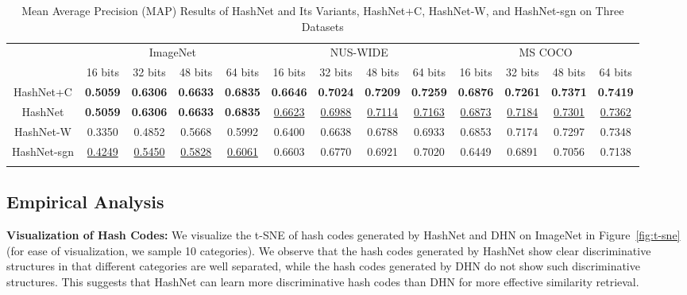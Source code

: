 \documentclass[10pt,twocolumn,letterpaper]{article}
\begin{document}
\begin{table*}[htb]
    \centering
    \addtolength{\tabcolsep}{-1.7pt}
    \caption{Mean Average Precision (MAP) Results of HashNet and Its Variants, HashNet+C, HashNet-W, and HashNet-sgn on Three Datasets}
    \label{table:ablation}
    \begin{tabular}{c|cccc|cccc|cccc}
        \Xhline{1.0pt}
        \multirow{2}{30pt}{\centering Method} & \multicolumn{4}{c|}{ImageNet} & \multicolumn{4}{c|}{NUS-WIDE} & \multicolumn{4}{c}{MS COCO} \\
        \cline{2-13}
        & 16 bits & 32 bits  & 48 bits  & 64 bits & 16 bits & 32 bits  & 48 bits  & 64 bits & 16 bits & 32 bits  & 48 bits  & 64 bits \\
        \hline
        HashNet+C & \textbf{0.5059} & \textbf{0.6306} & \textbf{0.6633} & \textbf{0.6835} & \textbf{0.6646} & \textbf{0.7024} & \textbf{0.7209} & \textbf{0.7259} & \textbf{0.6876} & \textbf{0.7261} & \textbf{0.7371} & \textbf{0.7419} \\
        HashNet & \textbf{0.5059} & \textbf{0.6306} & \textbf{0.6633} & \textbf{0.6835} & \underline{0.6623} & \underline{0.6988} & \underline{0.7114} & \underline{0.7163} & \underline{0.6873} & \underline{0.7184} & \underline{0.7301} & \underline{0.7362} \\
        HashNet-W & 0.3350 & 0.4852 & 0.5668 & 0.5992 & 0.6400 & 0.6638 & 0.6788 & 0.6933 & 0.6853 & 0.7174 & 0.7297 & 0.7348  \\
        HashNet-sgn & \underline{0.4249} & \underline{0.5450} & \underline{0.5828} & \underline{0.6061} & 0.6603 & 0.6770 & 0.6921 & 0.7020 & 0.6449 & 0.6891 & 0.7056 & 0.7138 \\
        \Xhline{1.0pt}
    \end{tabular}
    \normalsize
    \vspace{-10pt}
\end{table*}

\subsection{Empirical Analysis}
\textbf{Visualization of Hash Codes:}
We visualize the t-SNE \cite{cite:ICML14DeCAF} of hash codes generated by HashNet and DHN on ImageNet in Figure~\ref{fig:t-sne} (for ease of visualization, we sample 10 categories). We observe that the hash codes generated by HashNet show clear discriminative structures in that different categories are well separated, while the hash codes generated by DHN do not show such discriminative structures. This suggests that HashNet can learn more discriminative hash codes than DHN for more effective similarity retrieval.
\end{document}
